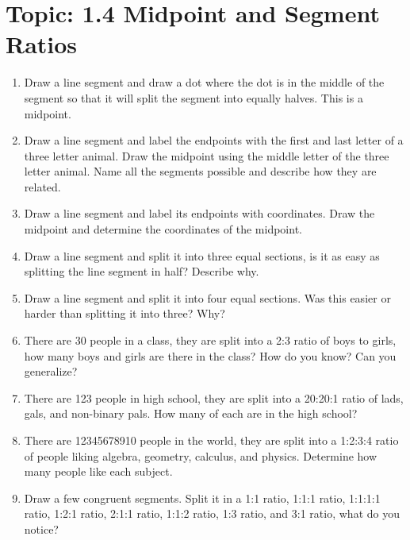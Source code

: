 \documentclass[12pt,letterpaper]{article}
\begin{document}
\section*{Topic: 1.4 Midpoint and Segment Ratios}
\begin{enumerate}
    \item Draw a line segment and draw a dot where the dot is in the middle of the segment so that it will split the segment into equally halves. This is a midpoint.
    \item Draw a line segment and label the endpoints with the first and last letter of a three letter animal. Draw the midpoint using the middle letter of the three letter animal. Name all the segments possible and describe how they are related.
    \item Draw a line segment and label its endpoints with coordinates. Draw the midpoint and determine the coordinates of the midpoint.
    \item Draw a line segment and split it into three equal sections, is it as easy as splitting the line segment in half? Describe why.
    \item Draw a line segment and split it into four equal sections. Was this easier or harder than splitting it into three? Why?
    \item There are 30 people in a class, they are split into a 2:3 ratio of boys to girls, how many boys and girls are there in the class? How do you know? Can you generalize?
    \item There are 123 people in high school, they are split into a 20:20:1 ratio of lads, gals, and non-binary pals. How many of each are in the high school?
    \item There are 12345678910 people in the world, they are split into a 1:2:3:4 ratio of people liking algebra, geometry, calculus, and physics. Determine how many people like each subject.
    \item Draw a few congruent segments. Split it in a 1:1 ratio, 1:1:1 ratio, 1:1:1:1 ratio, 1:2:1 ratio, 2:1:1 ratio, 1:1:2 ratio, 1:3 ratio, and 3:1 ratio, what do you notice?
\end{enumerate}
\end{document}
